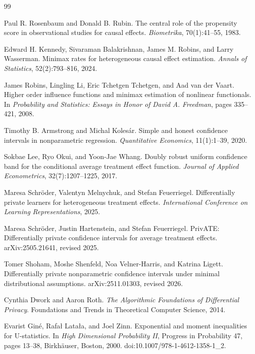 \documentclass{article}
\begin{document}
\begin{thebibliography}{99}

   Paul R. Rosenbaum and Donald B. Rubin. The central role of the propensity score in observational studies for causal effects. \emph{Biometrika}, 70(1):41--55, 1983.

   Edward H. Kennedy, Sivaraman Balakrishnan, James M. Robins, and Larry Wasserman. Minimax rates for heterogeneous causal effect estimation. \emph{Annals of Statistics}, 52(2):793--816, 2024.

   James Robins, Lingling Li, Eric Tchetgen Tchetgen, and Aad van der Vaart. Higher order influence functions and minimax estimation of nonlinear functionals. In \emph{Probability and Statistics: Essays in Honor of David A. Freedman}, pages 335--421, 2008.

   Timothy B. Armstrong and Michal Kolesár. Simple and honest confidence intervals in nonparametric regression. \emph{Quantitative Economics}, 11(1):1--39, 2020.

   Sokbae Lee, Ryo Okui, and Yoon-Jae Whang. Doubly robust uniform confidence band for the conditional average treatment effect function. \emph{Journal of Applied Econometrics}, 32(7):1207--1225, 2017.

   Maresa Schröder, Valentyn Melnychuk, and Stefan Feuerriegel. Differentially private learners for heterogeneous treatment effects. \emph{International Conference on Learning Representations}, 2025.

   Maresa Schröder, Justin Hartenstein, and Stefan Feuerriegel. PrivATE: Differentially private confidence intervals for average treatment effects. arXiv:2505.21641, revised 2025.

   Tomer Shoham, Moshe Shenfeld, Noa Velner-Harris, and Katrina Ligett. Differentially private nonparametric confidence intervals under minimal distributional assumptions. arXiv:2511.01303, revised 2026.

   Cynthia Dwork and Aaron Roth. \emph{The Algorithmic Foundations of Differential Privacy}. Foundations and Trends in Theoretical Computer Science, 2014.

   Evarist Gin\'e, Rafa{\l} Lata{\l}a, and Joel Zinn. Exponential and moment inequalities for U-statistics. In \emph{High Dimensional Probability II}, Progress in Probability 47, pages 13--38, Birkh\"auser, Boston, 2000. doi:10.1007/978-1-4612-1358-1\_2.


\end{thebibliography}
\end{document}
